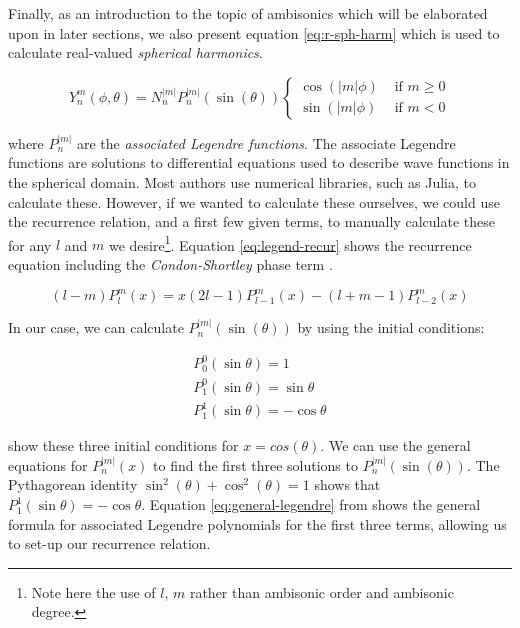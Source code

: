 Finally, as an introduction to the topic of ambisonics which will be elaborated upon in later sections, we also present equation \ref{eq:r-sph-harm} which is used to calculate real-valued \textit{spherical harmonics}.

\begin{equation}
Y_{n}^{m}(\phi, \theta)=N_{n}^{|m|} P_{n}^{|m|}(\sin (\theta))\left\{\begin{array}{ll}
\cos (|m| \phi) & \text { if } m \geq 0 \\
\sin (|m| \phi) & \text { if } m<0
\end{array}\right.
\label{eq:r-sph-harm}
\end{equation}

where $P_{n}^{|m|}$ are the \textit{associated Legendre functions}. The associate Legendre functions are solutions to differential equations used to describe wave functions in the spherical domain. Most authors use numerical libraries, such as Julia, to calculate these. However, if we wanted to calculate these ourselves, we could use the recurrence relation, and a first few given terms, to manually calculate these for any $l$ and $m$ we desire\footnote{Note here the use of $l$, $m$ rather than ambisonic order and ambisonic degree.}. Equation \ref{eq:legend-recur} shows the recurrence equation including the \textit{Condon-Shortley} phase term \cite{Associat51online}.

\begin{equation}
(l-m) P_{l}^{m}(x)=x(2 l-1) P_{l-1}^{m}(x)-(l+m-1) P_{l-2}^{m}(x)
\label{eq:legend-recur}
\end{equation}

In our case, we can calculate $P_{n}^{|m|}(\sin (\theta))$ by using the initial conditions: 

\begin{equation}
\begin{array}{l}
P_{0}^{0}(\sin \theta)=1 \\
P_{1}^{0}(\sin \theta)=\sin \theta \\
P_{1}^{1}(\sin \theta)=-\cos \theta
\end{array}
\end{equation}

\cite{Associat51online} show these three initial conditions for $x = cos(\theta)$. We can use the general equations for $P_{n}^{|m|}(x)$ to find the first three solutions to $P_{n}^{|m|}(\sin (\theta))$. The Pythagorean identity $\sin ^{2}(\theta)+\cos ^{2}(\theta)=1$ shows that $P_{1}^{1}(\sin \theta)=-\cos \theta$. Equation \ref{eq:general-legendre} from \cite{Associat51online} shows the general formula for associated Legendre polynomials for the first three terms, allowing us to set-up our recurrence relation.

